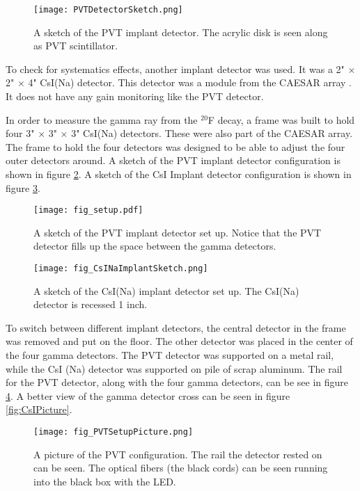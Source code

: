 \documentclass[../MaxHughesThesis.tex]{subfiles}
\begin{document}
\begin{figure}
	\centerline{\texttt{[image: PVTDetectorSketch.png]}}
	\caption{A sketch of the PVT implant detector.
		    The acrylic disk is seen along as PVT scintillator. 
		   }
	\label{fig:PVTDetSketch}
\end{figure}
To check for systematics effects, another implant detector was used.
It was a 2" $\times$ 2" $\times$ 4"  CsI(Na) detector. 
This detector was a module from the CAESAR array \cite{Wei10}.
It does not have any gain monitoring like the PVT detector.

In order to measure the gamma ray from the $^{20}$F decay, a frame was built to hold four 3" $\times$ 3" $\times$ 3" CsI(Na) detectors.  
These were also part of the CAESAR array.
The frame to hold the four detectors was designed to be able to adjust the four outer detectors around.
A sketch of the PVT implant detector configuration is shown in figure \ref{fig:detsketch}.
A sketch of the CsI Implant detector configuration is shown in figure \ref{fig:csiimdetsketch}.

\begin{figure}
	\centerline{\texttt{[image: fig\_setup.pdf]}}
	\caption{A sketch of the PVT implant detector set up. 
		 Notice that the PVT detector fills up the space between the gamma detectors.
		 }
	\label{fig:detsketch}
\end{figure}

\begin{figure}
	\centerline{\texttt{[image: fig\_CsINaImplantSketch.png]}}
	\caption{A sketch of the CsI(Na) implant detector set up. 
		    The CsI(Na) detector is recessed 1 inch. 
			}
	\label{fig:csiimdetsketch}
\end{figure}
To switch between different implant detectors, the central detector in the frame was removed and put on the floor.
The other detector was placed in the center of the four gamma detectors.
The PVT detector was supported on a metal rail, while the CsI (Na) detector was supported on pile of scrap aluminum.
The rail for the PVT detector, along with the four gamma detectors,  can be see in figure \ref{fig:PVTPicture}.
A better view of the gamma detector cross can be seen in figure \ref{fig:CsIPicture}.

\begin{figure}
	\centerline{\texttt{[image: fig\_PVTSetupPicture.png]}}
	\caption{A picture of the PVT configuration. 
		 The rail the detector rested on can be seen.
		 The optical fibers (the black cords) can be seen running into the black box with the LED.
		 }
	\label{fig:PVTPicture}
\end{figure}
\end{document}

